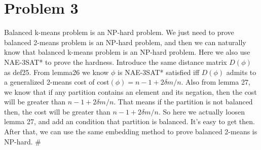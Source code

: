 \documentclass[twoside,11pt]{homework}
\begin{document}
\section*{Problem 3}
Balanced k-means problem is an NP-hard problem.\newline
We just need to prove balanced 2-means problem is an NP-hard problem, and then we can naturally know that balanced k-means problem is an NP-hard problem.
Here we also use NAE-3SAT* to prove the hardness. Introduce the same distance matrix $D(\phi)$ as def25. From lemma26 we know $\phi$ is NAE-3SAT* satisfied iff $D(\phi)$ admits to a generalized 2-means cost of cost$(\phi)=n-1+2\delta m/n$. Also from lemma 27, we know that if any partition contains an element and its negation, then the cost will be greater than $n-1+2\delta m/n$. That means if the partition is not balanced then, the cost will be greater than $n-1+2\delta m/n$. So here we actually loosen lemma 27, and add an condition that partition is balanced. It's easy to get then. After that, we can use the same embedding method to prove balanced 2-means is NP-hard. \#
\end{document}

